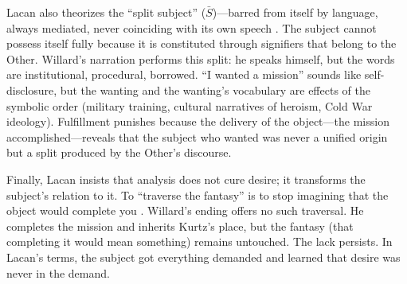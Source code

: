 Lacan also theorizes the ``split subject'' ($\bar{S}$)---barred from itself by language, always
mediated, never coinciding with its own speech \parencite{LacanEcrits2006}. The subject cannot
possess itself fully because it is constituted through signifiers that belong to the Other.
Willard's narration performs this split: he speaks himself, but the words are institutional,
procedural, borrowed. ``I wanted a mission'' sounds like self-disclosure, but the wanting and
the wanting's vocabulary are effects of the symbolic order (military training, cultural
narratives of heroism, Cold War ideology). Fulfillment punishes because the delivery of the
object---the mission accomplished---reveals that the subject who wanted was never a unified
origin but a split produced by the Other's discourse.

Finally, Lacan insists that analysis does not cure desire; it transforms the subject's relation
to it. To ``traverse the fantasy'' is to stop imagining that the object would complete you
\parencite{LacanSeminarXI1991}. Willard's ending offers no such traversal. He completes the
mission and inherits Kurtz's place, but the fantasy (that completing it would mean something)
remains untouched. The lack persists. In Lacan's terms, the subject got everything demanded
and learned that desire was never in the demand.
